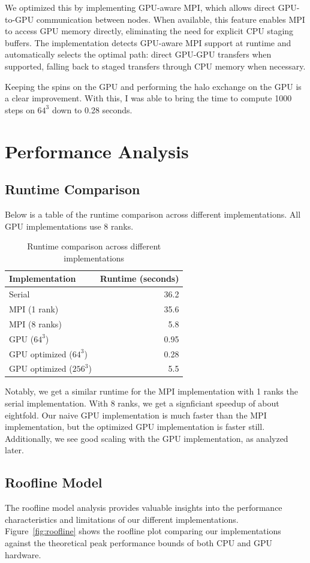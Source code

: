 \documentclass{article}
\begin{document}
We optimized this by implementing GPU-aware MPI, which allows direct GPU-to-GPU communication between nodes. When available, this feature enables MPI to access GPU memory directly, eliminating the need for explicit CPU staging buffers. The implementation detects GPU-aware MPI support at runtime and automatically selects the optimal path: direct GPU-GPU transfers when supported, falling back to staged transfers through CPU memory when necessary.

Keeping the spins on the GPU and performing the halo exchange on the GPU is a clear improvement. With this, I was able to bring the time to compute 1000 steps on $64^3$ down to 0.28 seconds.

\section{Performance Analysis}
\subsection{Runtime Comparison}

Below is a table of the runtime comparison across different implementations. All GPU implementations use 8 ranks.
\begin{table}[H]
\centering
\begin{tabular}{|l|r|}
    \hline
    \textbf{Implementation} & \textbf{Runtime (seconds)} \\
    \hline
    Serial & 36.2 \\
    MPI (1 rank) & 35.6 \\
    MPI (8 ranks) & 5.8 \\
    GPU ($64^3$) & 0.95 \\
    GPU optimized ($64^3$) & 0.28 \\
    GPU optimized ($256^3$) & 5.5 \\
    \hline
\end{tabular}
\caption{Runtime comparison across different implementations}
\end{table}

Notably, we get a similar runtime for the MPI implementation with 1 ranks the serial implementation. With 8 ranks, we get a signficiant speedup of about eightfold. Our naive GPU implementation is much faster than the MPI implementation, but the optimized GPU implementation is faster still. Additionally, we see good scaling with the GPU implementation, as analyzed later.

\subsection{Roofline Model}
The roofline model analysis provides valuable insights into the performance characteristics and limitations of our different implementations. Figure~\ref{fig:roofline} shows the roofline plot comparing our implementations against the theoretical peak performance bounds of both CPU and GPU hardware.
\end{document}
